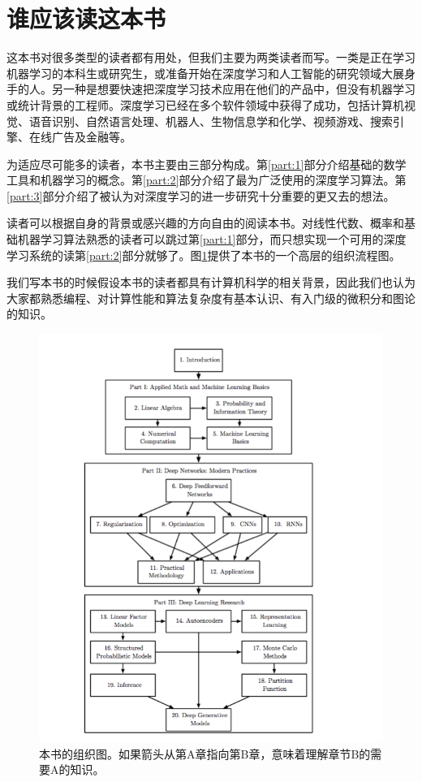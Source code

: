 \documentclass[a4paper,11pt]{book}
\begin{document}
\section{谁应该读这本书}

这本书对很多类型的读者都有用处，但我们主要为两类读者而写。一类是正在学习机器学习的本科生或研究生，或准备开始在深度学习和人工智能的研究领域大展身手的人。另一种是想要快速把深度学习技术应用在他们的产品中，但没有机器学习或统计背景的工程师。深度学习已经在多个软件领域中获得了成功，包括计算机视觉、语音识别、自然语言处理、机器人、生物信息学和化学、视频游戏、搜索引擎、在线广告及金融等。


为适应尽可能多的读者，本书主要由三部分构成。第\ref{part:1}部分介绍基础的数学工具和机器学习的概念。第\ref{part:2}部分介绍了最为广泛使用的深度学习算法。第\ref{part:3}部分介绍了被认为对深度学习的进一步研究十分重要的更又去的想法。


读者可以根据自身的背景或感兴趣的方向自由的阅读本书。对线性代数、概率和基础机器学习算法熟悉的读者可以跳过第\ref{part:1}部分，而只想实现一个可用的深度学习系统的读第\ref{part:2}部分就够了。图\ref{fig:1.6}提供了本书的一个高层的组织流程图。


我们写本书的时候假设本书的读者都具有计算机科学的相关背景，因此我们也认为大家都熟悉编程、对计算性能和算法复杂度有基本认识、有入门级的微积分和图论的知识。

\begin{figure}[htbp] %
   \centering
   \includegraphics[width=7in]{fig/chap1/1.6.png} 
   \caption{本书的组织图。如果箭头从第A章指向第B章，意味着理解章节B的需要A的知识。}
   \label{fig:1.6}
\end{figure}
\end{document}

